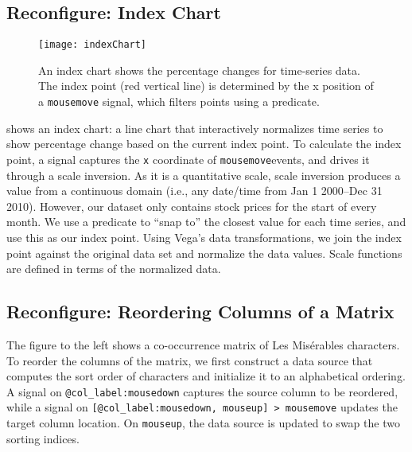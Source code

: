 \subsection{Reconfigure: Index Chart}

\vspace{-7pt}

\begin{figure}[b!]
  \centering
  \texttt{[image: indexChart]}
  \caption{An index chart shows the percentage changes for time-series data. The
  index point (red vertical line) is determined by the x position of a
  \texttt{mousemove} signal, which filters points using a predicate.}
  \label{fig:vg:indexChart}
\end{figure}

 shows an index chart: a line chart that interactively
normalizes time series to show percentage change based on the current index
point. To calculate the index point, a signal captures the \texttt{x} coordinate
of \texttt{mousemove}events, and drives it through a scale inversion. As it is a
quantitative scale, scale inversion produces a value from a continuous domain
(i.e., any date/time from Jan 1 2000--Dec 31 2010). However, our dataset only
contains stock prices for the start of every month. We use a predicate to ``snap
to'' the closest value for each time series, and use this as our index point.
Using Vega's data transformations, we join the index point against the original
data set and normalize the data values. Scale functions are defined in terms of
the normalized data.

\vspace{-10pt}

\subsection{Reconfigure: Reordering Columns of a Matrix}

\vspace{-7pt}


\vspace{-7pt}

The figure to the left shows a co-occurrence matrix of Les Mis\'{e}rables
characters. To reorder the columns of the matrix, we first construct a data
source that computes the sort order of characters and initialize it to an
alphabetical ordering. A signal on \texttt{@col\_label:mousedown} captures the
source column to be reordered, while a signal on \texttt{[@col\_label:mousedown,
mouseup] > mousemove} updates the target column location. On \texttt{mouseup},
the data source is updated to swap the two sorting indices.

